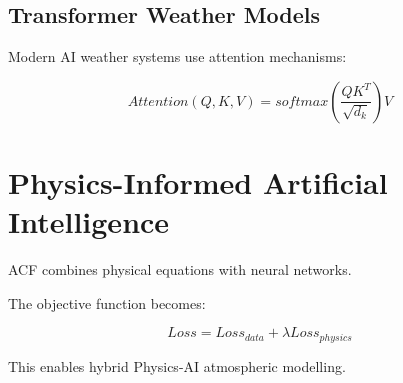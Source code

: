 \subsection{Transformer Weather Models}

Modern AI weather systems use attention mechanisms:

\begin{equation}
Attention(Q,K,V)
=
softmax
\left(
\frac{QK^T}{\sqrt{d_k}}
\right)V
\end{equation}



\section{Physics-Informed Artificial Intelligence}

ACF combines physical equations with neural networks.

The objective function becomes:

\begin{equation}
Loss =
Loss_{data}
+
\lambda Loss_{physics}
\end{equation}


This enables hybrid Physics-AI atmospheric modelling.
